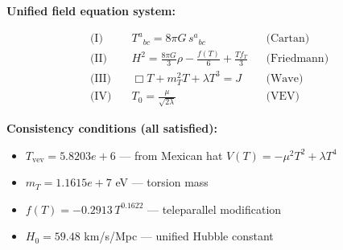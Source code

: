 
\textbf{Unified field equation system:}

\begin{align}
  \text{(I)} \quad & T^a{}_{bc} = 8\pi G \, s^a{}_{bc} && \text{(Cartan)} \\
  \text{(II)} \quad & H^2 = \frac{8\pi G}{3}\rho - \frac{f(T)}{6} + \frac{Tf_T}{3} && \text{(Friedmann)} \\
  \text{(III)} \quad & \Box T + m_T^2 T + \lambda T^3 = J && \text{(Wave)} \\
  \text{(IV)} \quad & T_0 = \frac{\mu}{\sqrt{2\lambda}} && \text{(VEV)}
\end{align}

\textbf{Consistency conditions (all satisfied):}
\begin{itemize}
  \item $T_{\text{vev}} = 5.8203e+6$ — from Mexican hat $V(T) = -\mu^2 T^2 + \lambda T^4$
  \item $m_T = 1.1615e+7$ eV — torsion mass
  \item $f(T) = -0.2913 \, T^{0.1622}$ — teleparallel modification
  \item $H_0 = 59.48$ km/s/Mpc — unified Hubble constant
\end{itemize}